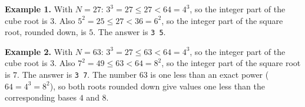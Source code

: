 \textbf{Example 1.} With $N = 27$: $3^3 = 27 \le 27 < 64 = 4^3$, so the integer part of the cube root is $3$. Also $5^2 = 25 \le 27 < 36 = 6^2$, so the integer part of the square root, rounded down, is $5$. The answer is \texttt{3 5}.

\textbf{Example 2.} With $N = 63$: $3^3 = 27 \le 63 < 64 = 4^3$, so the integer part of the cube root is $3$. Also $7^2 = 49 \le 63 < 64 = 8^2$, so the integer part of the square root is $7$. The answer is \texttt{3 7}. The number $63$ is one less than an exact power ($64 = 4^3 = 8^2$), so both roots rounded down give values one less than the corresponding bases $4$ and $8$.
